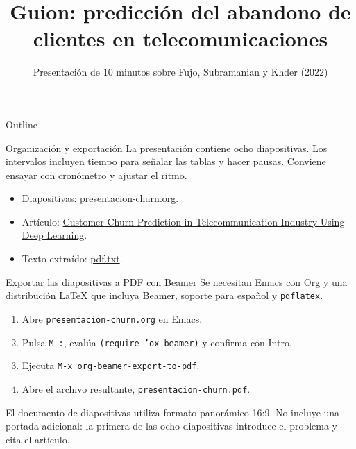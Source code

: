 \documentclass[presentation]{beamer}
\date{}
\title{Guion: predicción del abandono de clientes en telecomunicaciones}
\subtitle{Presentación de 10 minutos sobre Fujo, Subramanian y Khder (2022)}
\begin{document}
\maketitle
\begin{frame}{Outline}
\setcounter{tocdepth}{2}
\tableofcontents
\end{frame}

\begin{frame}[label={sec:orgfd78e5b},fragile]{Organización y exportación}
 La presentación contiene ocho diapositivas. Los intervalos incluyen tiempo para señalar las tablas y hacer pausas. Conviene ensayar con cronómetro y ajustar el ritmo.

\begin{itemize}
\item Diapositivas: \href{presentacion-churn.org}{presentacion-churn.org}.
\item Artículo: \href{Customer Churn Prediction in Telecommunication Industry Using Deep Learning.pdf}{Customer Churn Prediction in Telecommunication Industry Using Deep Learning}.
\item Texto extraído: \href{pdf.txt}{pdf.txt}.
\end{itemize}
\begin{block}{Exportar las diapositivas a PDF con Beamer}
Se necesitan Emacs con Org y una distribución \LaTeX{} que incluya Beamer, soporte para español y \texttt{pdflatex}.

\begin{enumerate}
\item Abre \texttt{presentacion-churn.org} en Emacs.
\item Pulsa \texttt{M-:}, evalúa \texttt{(require 'ox-beamer)} y confirma con Intro.
\item Ejecuta \texttt{M-x org-beamer-export-to-pdf}.
\item Abre el archivo resultante, \texttt{presentacion-churn.pdf}.
\end{enumerate}

El documento de diapositivas utiliza formato panorámico 16:9. No incluye una portada adicional: la primera de las ocho diapositivas introduce el problema y cita el artículo.
\end{block}
\end{frame}
\end{document}
